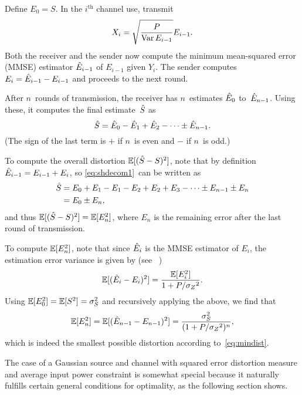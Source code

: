 \begin{example}
  \label{ex:gaussfb}
  Define $E_0 = S$. In the $i^{\text{th}}$ channel use, transmit
  \begin{equation*}
    X_i = \sqrt{\frac{P}{\operatorname{Var} E_{i-1}}} E_{i-1}.
  \end{equation*}
  Both the receiver and the sender now compute the minimum mean-squared
  error (MMSE) estimator $\hat{E}_{i-1}$ of $E_{i-1}$ given $Y_i$. The sender
  computes $E_i = \hat{E}_{i-1} - E_{i-1}$ and proceeds to the next round.

  After $n$~rounds of transmission, the receiver has $n$~estimates $\hat{E}_0$
  to~$\hat{E}_{n-1}$. Using these, it computes the final estimate~${\hat{S}}$ as
  \begin{equation}
    \label{eq:shdecom1}
    {\hat{S}} = \hat{E}_0 - \hat{E}_1 + \hat{E}_2 - \cdots \pm \hat{E}_{n-1}.
  \end{equation}
  (The sign of the last term is $+$ if $n$~is even and $-$ if $n$~is odd.)

  To compute the overall distortion ${\mathbb{E}[({\hat{S}} - S)^2]}$, note that by definition $\hat{E}_{i-1} =
  E_{i-1} + E_i$, so \eqref{eq:shdecom1}~can be written as
  \begin{align*}
    {\hat{S}} &= E_0 + E_1 - E_1 - E_2 + E_2 + E_3 - \cdots \pm E_{n-1} \pm E_n \\
    &= E_0 \pm E_n,
  \end{align*}
  and thus ${\mathbb{E}[({\hat{S}} - S)^2]} = \mathbb{E}[E_n^2]$, where $E_n$ is the remaining error after the last
  round of transmission.

  To compute $\mathbb{E}[E_n^2]$, note that since $\hat{E}_i$ is the MMSE estimator of
  $E_i$, the estimation error variance is given by (see
  \eg~\cite[Section~8.3]{Scharf1990})
  \begin{equation*}
    \mathbb{E}[(\hat{E}_i - E_i)^2] = \frac{\mathbb{E}[E_i^2]}{1 + P/{{\sigma_Z}^2}}.
  \end{equation*}
  Using $\mathbb{E}[E_0^2] = \mathbb{E}[S^2] = {\sigma_S^2}$ and recursively applying the above, we find
  that
  \begin{equation*}
    \mathbb{E}[E_n^2] = \mathbb{E}[(\hat{E}_{n-1} - E_{n-1})^2] = \frac{{\sigma_S^2}}{(1 + P/{{\sigma_Z}^2})^n},
  \end{equation*}
  which is indeed the smallest possible distortion according
  to~\eqref{eq:mindist}.
\end{example}

The case of a Gaussian source and channel with squared error distortion measure
and average input power constraint is somewhat special because it naturally
fulfills certain general conditions for optimality, as the following section
shows. 


